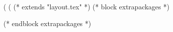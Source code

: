 (%
(%
(* extends "layout.tex" *)
(* block extrapackages *)
   \usepackage[
     a4paper %
     ,includeheadfoot %
     ,hmarginratio=1:1 %
     ,outer=1.8cm %
     ,vmarginratio=1:1 %
     ,bmargin=1.3cm %
     ]{geometry}
  \usepackage{chords}
(* endblock extrapackages *)

